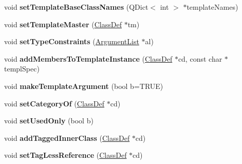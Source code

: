 \begin{DoxyCompactItemize}
\item 
\hypertarget{class_class_def_a4f3404802c3c0e8943848f2043071ce2}{void {\bfseries set\-Template\-Base\-Class\-Names} (Q\-Dict$<$ int $>$ $\ast$template\-Names)}\label{class_class_def_a4f3404802c3c0e8943848f2043071ce2}

\item 
\hypertarget{class_class_def_a30f1788720afbe319d8638f4c6a8a060}{void {\bfseries set\-Template\-Master} (\hyperlink{class_class_def}{Class\-Def} $\ast$tm)}\label{class_class_def_a30f1788720afbe319d8638f4c6a8a060}

\item 
\hypertarget{class_class_def_ac805ef0f9105033770cacf6bb063547c}{void {\bfseries set\-Type\-Constraints} (\hyperlink{class_argument_list}{Argument\-List} $\ast$al)}\label{class_class_def_ac805ef0f9105033770cacf6bb063547c}

\item 
\hypertarget{class_class_def_a40795fcf3b052c11ea4f3fcf9682dad7}{void {\bfseries add\-Members\-To\-Template\-Instance} (\hyperlink{class_class_def}{Class\-Def} $\ast$cd, const char $\ast$templ\-Spec)}\label{class_class_def_a40795fcf3b052c11ea4f3fcf9682dad7}

\item 
\hypertarget{class_class_def_a9e66210b07e1de96620b6f1df719f2b2}{void {\bfseries make\-Template\-Argument} (bool b=T\-R\-U\-E)}\label{class_class_def_a9e66210b07e1de96620b6f1df719f2b2}

\item 
\hypertarget{class_class_def_ab46f4cc1c4c1225a86f6deddd20c4d2e}{void {\bfseries set\-Category\-Of} (\hyperlink{class_class_def}{Class\-Def} $\ast$cd)}\label{class_class_def_ab46f4cc1c4c1225a86f6deddd20c4d2e}

\item 
\hypertarget{class_class_def_a9be86fca6f0963b5d0b38425e2caac99}{void {\bfseries set\-Used\-Only} (bool b)}\label{class_class_def_a9be86fca6f0963b5d0b38425e2caac99}

\item 
\hypertarget{class_class_def_ac569051d53fedf74bf3499ff35f7f084}{void {\bfseries add\-Tagged\-Inner\-Class} (\hyperlink{class_class_def}{Class\-Def} $\ast$cd)}\label{class_class_def_ac569051d53fedf74bf3499ff35f7f084}

\item 
\hypertarget{class_class_def_a7d28692dbcd1f9f59d5f2d7dcfb7e3d7}{void {\bfseries set\-Tag\-Less\-Reference} (\hyperlink{class_class_def}{Class\-Def} $\ast$cd)}\label{class_class_def_a7d28692dbcd1f9f59d5f2d7dcfb7e3d7}


\end{DoxyCompactItemize}
